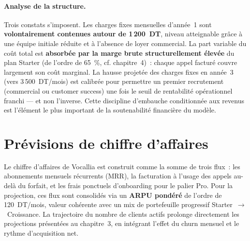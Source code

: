 \paragraph{Analyse de la structure.} Trois constats s'imposent. Les charges fixes mensuelles d'année~1 sont \textbf{volontairement contenues autour de 1\,200~DT}, niveau atteignable grâce à une équipe initiale réduite et à l'absence de loyer commercial. La part variable du coût total est \textbf{absorbée par la marge brute structurellement élevée} du plan Starter (de l'ordre de 65~\%, cf. chapitre~4)~: chaque appel facturé couvre largement son coût marginal. La hausse projetée des charges fixes en année~3 (vers 3\,500~DT/mois) est calibrée pour permettre un premier recrutement (commercial ou customer success) une fois le seuil de rentabilité opérationnel franchi — et non l'inverse. Cette discipline d'embauche conditionnée aux revenus est l'élément le plus important de la soutenabilité financière du modèle.

\section{Prévisions de chiffre d'affaires}
\label{sec:previsions_ca}

Le chiffre d'affaires de Vocallia est construit comme la somme de trois flux~: les abonnements mensuels récurrents (MRR), la facturation à l'usage des appels au-delà du forfait, et les frais ponctuels d'onboarding pour le palier Pro. Pour la projection, ces flux sont consolidés via un \textbf{ARPU pondéré} de l'ordre de 120~DT/mois, valeur cohérente avec un mix de portefeuille progressif Starter~$\to$~Croissance. La trajectoire du nombre de clients actifs prolonge directement les projections présentées au chapitre~3, en intégrant l'effet du churn mensuel et le rythme d'acquisition net.

